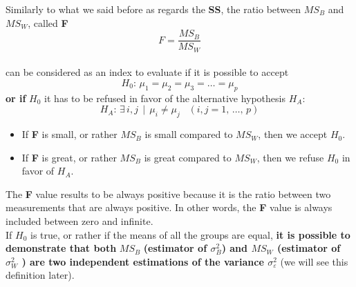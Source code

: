 \begin{frame}
  \vspace*{.25cm}
  Similarly to what we said before as regards the \textbf{SS}, the ratio between {\boldmath$MS_B$} and {\boldmath$MS_W$}, called \textbf{F} 
  $$ F = \frac{MS_B}{MS_W} $$\\
  \vspace*{.25cm}
  can be considered as an index to evaluate if it is possible to accept
  $$ H_0: \, \mu_1 = \mu_2 = \mu_3 = \dots = \mu_p $$
  \vspace*{.25cm}
  \textbf{or if} {\boldmath$H_0$} it has to be refused in favor of the alternative hypothesis {\boldmath$H_A$}:
  $$ H_A: \, \exists \, i,j \,\mid\,\mu_i\neq\mu_j\;\;\;(i,j=1,\,\dots,\,p)$$
\end{frame}

\begin{frame}
  \vspace*{.25cm}
  \begin{itemize} 
    \item If \textbf{F} is small, or rather {\boldmath$MS_B$} is small compared to {\boldmath$MS_W$}, then we accept {\boldmath$H_0$}.
    \item If \textbf{F} is great, or rather {\boldmath$MS_B$} is great compared to {\boldmath$MS_W$}, then we refuse {\boldmath$H_0$} in favor of {\boldmath$H_A$}.\\
  \end{itemize}
  \vspace*{.25cm}
  The \textbf{F} value results to be always positive because it is the ratio between two measurements that are always positive. In other words, the \textbf{F} value is always included between zero and infinite. \\
  \vspace*{.25cm}
  If {\boldmath$H_0$} is true, or rather if the means of all the groups are equal, \textbf{it is possible to demonstrate that both} {\boldmath$MS_B$} \textbf{(estimator of {\boldmath$\sigma^2_B$}) and {\boldmath$MS_W$} (estimator of {\boldmath$\sigma^2_W$} ) are two independent estimations of the variance {\boldmath$\sigma^2_{\varepsilon}$}} (we will see this definition later).
\end{frame}

